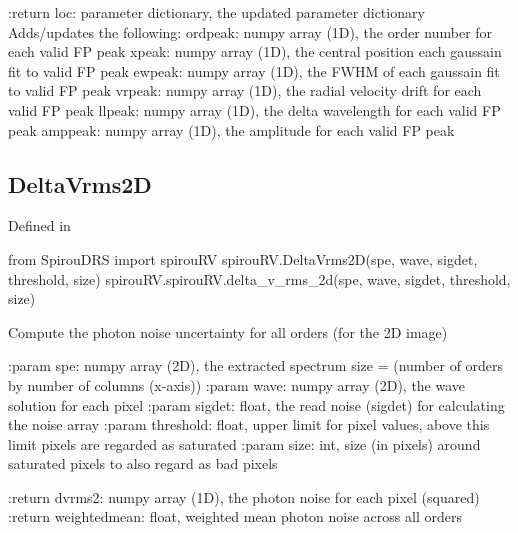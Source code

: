 \begin{minipage}{\textwidth}
\begin{pythondocstring}
:return loc: parameter dictionary, the updated parameter dictionary
        Adds/updates the following:
            ordpeak: numpy array (1D), the order number for each valid FP
                     peak
            xpeak: numpy array (1D), the central position each gaussain fit
                   to valid FP peak
            ewpeak: numpy array (1D), the FWHM of each gaussain fit
                    to valid FP peak
            vrpeak: numpy array (1D), the radial velocity drift for each
                    valid FP peak
            llpeak: numpy array (1D), the delta wavelength for each valid
                    FP peak
            amppeak: numpy array (1D), the amplitude for each valid FP peak
\end{pythondocstring}
\end{minipage}

\noindent\begin{minipage}{\textwidth}
\subsection{DeltaVrms2D}

Defined in \spirouRV{}

\begin{pythonbox}
from SpirouDRS import spirouRV
spirouRV.DeltaVrms2D(spe, wave, sigdet, threshold, size)
spirouRV.spirouRV.delta_v_rms_2d(spe, wave, sigdet, threshold, size)
\end{pythonbox}

\begin{pythondocstring}
Compute the photon noise uncertainty for all orders (for the 2D image)

:param spe: numpy array (2D), the extracted spectrum
            size = (number of orders by number of columns (x-axis))
:param wave: numpy array (2D), the wave solution for each pixel
:param sigdet: float, the read noise (sigdet) for calculating the
               noise array
:param threshold: float, upper limit for pixel values, above this limit
                  pixels are regarded as saturated
:param size: int, size (in pixels) around saturated pixels to also regard
             as bad pixels

:return dvrms2: numpy array (1D), the photon noise for each pixel (squared)
:return weightedmean: float, weighted mean photon noise across all orders
\end{pythondocstring}
\end{minipage}

